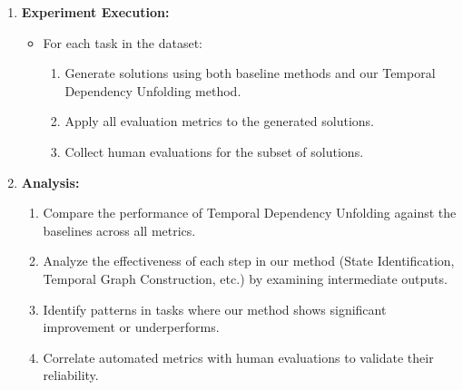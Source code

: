 \begin{tcolorbox}[colback=blue!5!white,colframe=blue!75!black,title=\textbf{Temporal Dependency Unfolding: Improving Code Generation for Complex Stateful Systems (Part 2)}]
{\begin{enumerate}
    \begin{itemize}
        \item Recruit 5 experienced developers to review a subset of 30 generated solutions (10 from each domain).
        \item They will rate the code on a scale of 1-5 for readability, maintainability, and correct handling of temporal dependencies.
    \end{itemize}
    \item \textbf{Experiment Execution:}
    \begin{itemize}
        \item For each task in the dataset:
        \begin{enumerate}
            \item Generate solutions using both baseline methods and our Temporal Dependency Unfolding method.
            \item Apply all evaluation metrics to the generated solutions.
            \item Collect human evaluations for the subset of solutions.
        \end{enumerate}
    \end{itemize}
    \item \textbf{Analysis:}
    \begin{enumerate}
        \item Compare the performance of Temporal Dependency Unfolding against the baselines across all metrics.
        \item Analyze the effectiveness of each step in our method (State Identification, Temporal Graph Construction, etc.) by examining intermediate outputs.
        \item Identify patterns in tasks where our method shows significant improvement or underperforms.
        \item Correlate automated metrics with human evaluations to validate their reliability.
    \end{enumerate}
\end{enumerate}
}
\end{tcolorbox}

\newpage

